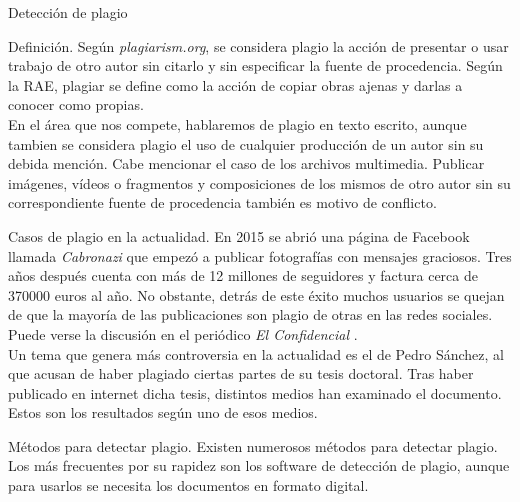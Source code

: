 	\begin{section}{Detecci\'on de plagio}
		
		\begin{subsection}{Definici\'on.}
			Seg\'un \textit{plagiarism.org}\cite{plagiarism_org}, se considera plagio la acci\'on de presentar o usar trabajo de otro autor sin citarlo y sin especificar la fuente de procedencia.
			Seg\'un la RAE\cite{rae}, plagiar se define como la acci\'on de copiar obras ajenas y darlas a conocer como propias.\\
			
			En el \'area que nos compete, hablaremos de plagio en texto escrito, aunque tambien se considera plagio el uso de cualquier producci\'on de un autor sin su debida menci\'on. Cabe mencionar el caso de los archivos multimedia. Publicar im\'agenes, v\'ideos o fragmentos y composiciones de los mismos de otro autor sin su correspondiente fuente de procedencia tambi\'en es motivo de conflicto.
			
		\end{subsection}
		
		\begin{subsection}{Casos de plagio en la actualidad.}
			En 2015 se abri\'o una p\'agina de Facebook llamada \textit{Cabronazi} que empez\'o a publicar fotograf\'ias con mensajes graciosos. Tres a\~nos despu\'es cuenta con m\'as de 12 millones de seguidores y factura cerca de 370000 euros al a\~no. No obstante, detr\'as de este \'exito muchos usuarios se quejan de que la mayor\'ia de las publicaciones son plagio de otras en las redes sociales. Puede verse la discusi\'on en el peri\'odico \textit{El Confidencial}\cite{elconfidencial} .\\
			
			
			Un tema que genera m\'as controversia en la actualidad es el de Pedro S\'anchez, al que acusan de haber plagiado ciertas partes de su tesis doctoral. Tras haber publicado en internet dicha tesis, distintos medios han examinado el documento. Estos son los resultados seg\'un uno de esos medios\cite{sanchez}.
			
		\end{subsection}
		
		\begin{subsection}{M\'etodos para detectar plagio.}
			Existen numerosos m\'etodos para detectar plagio. Los m\'as frecuentes por su rapidez son los software de detecci\'on de plagio, aunque para usarlos se necesita los documentos en formato digital.\\ 
			\begin{itemize}
				

\end{itemize}
\end{subsection}
\end{section}

